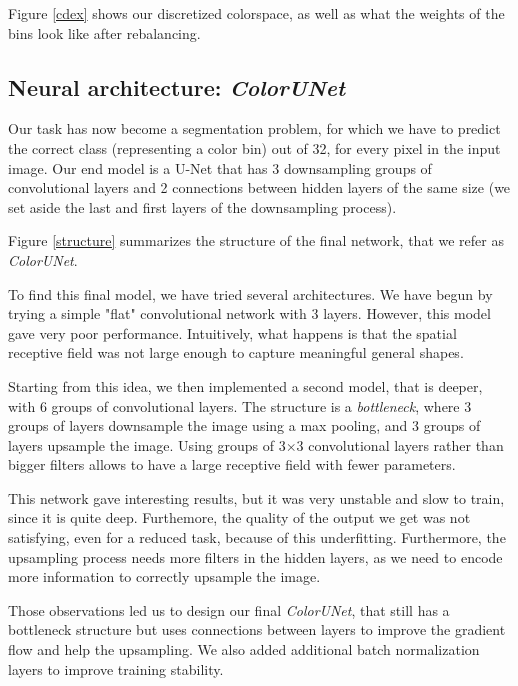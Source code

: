 \documentclass[10pt,twocolumn,letterpaper]{article}
\begin{document}
Figure \ref{cdex} shows our discretized colorspace, as well as what the weights of the bins look like after rebalancing.

\subsection{Neural architecture: \textit{ColorUNet}}

Our task has now become a segmentation problem, for which we have to predict the correct class (representing a color bin) out of 32, for every pixel in the input image. Our end model is a U-Net that has 3 downsampling groups of convolutional layers and 2 connections between hidden layers of the same size (we set aside the last and first layers of the downsampling process).

Figure \ref{structure} summarizes the structure of the final network, that we refer as \textit{ColorUNet}.

To find this final model, we have tried several architectures. We have begun by trying a simple "flat" convolutional network with 3 layers. However, this model gave very poor performance. Intuitively, what happens is that the spatial receptive field was not large enough to capture meaningful general shapes.

Starting from this idea, we then implemented a second model, that is deeper, with 6 groups of convolutional layers. The structure is a \textit{bottleneck}, where 3 groups of layers downsample the image using a max pooling, and 3 groups of layers upsample the image. Using groups of 3$\times$3 convolutional layers rather than bigger filters allows to have a large receptive field with fewer parameters.

This network gave interesting results, but it was very unstable and slow to train, since it is quite deep. Furthemore, the quality of the output we get was not satisfying, even for a reduced task, because of this underfitting. Furthermore, the upsampling process needs more filters in the hidden layers, as we need to encode more information to correctly upsample the image.

Those observations led us to design our final \textit{ColorUNet}, that still has a bottleneck structure but uses connections between layers to improve the gradient flow and help the upsampling. We also added additional batch normalization layers to improve training stability.
\end{document}
